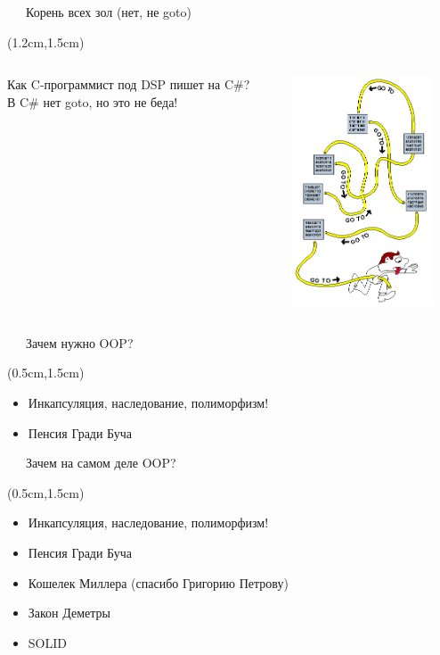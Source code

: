 \documentclass[xetex,18pt,aspectratio=43]{beamer}
\begin{document}
\begin{Large}
\begin{frame}{\ \ \ Корень всех зол (нет, не goto)}
\begin{textblock*}{\framewidth-0.5cm}(1.2cm,1.5cm)
  \begin{columns}[onlytextwidth,t]
    \begin{column}{0.5\textwidth}
      Как C-программист под DSP пишет на C{\lserif\#}?\\
      {\small В C{\lserif\#} нет goto, но это не беда!}
    \end{column}
    \begin{column}{0.5\textwidth}
      \centering
      \includegraphics[height=6.8cm,valign=t]{img/spaghetti.png}
    \end{column}
  \end{columns}
\end{textblock*}
\end{frame}

\begin{frame}{\ \ \ Зачем нужно OOP?}
\begin{textblock*}{\framewidth-0.8cm}(0.5cm,1.5cm)
\begin{itemize}
  \item Инкапсуляция, наследование, полиморфизм!
  \item Пенсия Гради Буча
\end{itemize}
\end{textblock*}
\end{frame}

\begin{frame}{\ \ \ Зачем на самом деле OOP?}
\begin{textblock*}{\framewidth-0.8cm}(0.5cm,1.5cm)
\begin{itemize}
  \item Инкапсуляция, наследование, полиморфизм!
  \item Пенсия Гради Буча
  \item Кошелек Миллера (спасибо Григорию Петрову)
  \item Закон Деметры
  \item SOLID
\end{itemize}
\end{textblock*}
\end{frame}


\end{Large}
\end{document}
